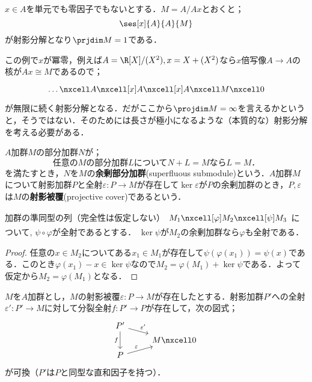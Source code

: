 \begin{ex}
	$x\in A$を単元でも零因子でもないとする．$M=A/Ax$とおくと；
	\[\ses[x]{A}{A}{M}\]
	が射影分解となり$\prjdim M=1$である．
\end{ex}

この例で$x$が冪零，例えば$A=\R[X]/(X^2),x=X+(X^2)$なら$x$倍写像$A\to A$の核が$Ax\cong M$であるので；
\[\begin{tikzcd}
	\dots\nxcell A\nxcell[x]A\nxcell[x] A\nxcell M\nxcell0
\end{tikzcd}\]
が無限に続く射影分解となる．だがここから$\projdim M=\infty$を言えるかというと，そうではない．そのためには長さが極小になるような（本質的な）射影分解を考える必要がある．

\begin{defi}[射影被覆]
	$A$加群$M$の部分加群$N$が；
	\[\text{任意の$M$の部分加群$L$について$N+L=M$なら$L=M$．}\]
	を満たすとき，$N$を$M$の\textbf{余剰部分加群}(superfluous submodule)という．$A$加群$M$について射影加群$P$と全射$\varepsilon:P\to M$が存在して$\ker\varepsilon$が$P$の余剰加群のとき，$P,\varepsilon$は$M$の\textbf{射影被覆}(projective cover)であるという．
\end{defi}

\begin{lem}\label{lem:余剰加群の補題}
	加群の準同型の列（完全性は仮定しない）$\begin{tikzcd}
	M_1\nxcell[\varphi]M_2\nxcell[\psi]M_3
	\end{tikzcd}$について, $\psi\circ\varphi$が全射であるとする． $\ker\psi $が$M_2$の余剰加群なら$\varphi$も全射である．
\end{lem}

\begin{proof}
	任意の$x\in M_2$についてある$x_1\in M_1$が存在して$\psi(\varphi(x_1))=\psi(x)$である．このとき$\varphi(x_1)-x\in\ker\psi$なので$M_2=\varphi(M_1)+\ker\psi$である．よって仮定から$M_2=\varphi(M_1)$となる．
\end{proof}

\begin{prop}\label{prop:射影被覆が同型の補題}
	$M$を$A$加群とし，$M$の射影被覆$\varepsilon:P\to M$が存在したとする．射影加群$P'$への全射$\varepsilon':P'\to M$に対して分裂全射$f:P'\to P$が存在して，次の図式；
	\[\begin{tikzcd}
		P'\arrow[dd,"f",swap]\arrow[dr,"\varepsilon'"]\\[-1.5em]
		&M\nxcell0\\[-1.5em]
		P\arrow[ur,"\varepsilon"]
	\end{tikzcd}\]
	が可換（$P'$は$P$と同型な直和因子を持つ）．
\end{prop}

